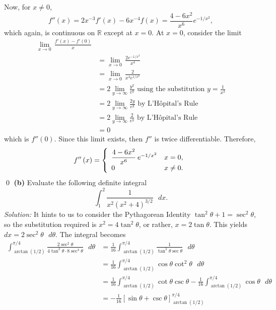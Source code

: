 \documentclass{article}
\begin{document}
\newline Now, for $x\ne 0$, \[f''(x)=2x^{-3}f'(x)-6x^{-4}f(x)=\frac{4-6x^2}{x^6}e^{-1/x^2},\] which again, is continuous on $\mathbb{R}$ except at $x=0$. At $x=0$, consider the limit \begin{align*}
    \underset{x\to 0}{\mathop{\lim }}\,\frac{f'(x)-f'(0)}{x}\\&=\underset{x\to 0}{\mathop{\lim }}\,\frac{2{{e}^{-1/{{x}^{2}}}}}{{{x}^{4}}}\\&=\underset{x\to 0}{\mathop{\lim }}\,\frac{2}{{{x}^{4}}{{e}^{1/{{x}^{2}}}}}\\&=2\lim_{y\rightarrow \infty}\frac{y^2}{e^y}\text{ using the substitution }y=\frac{1}{x^2}\\
    &=2\lim_{y\rightarrow \infty}\frac{2y}{e^y}\text{ by L'Hôpital's Rule}\\
    &=2\lim_{y\rightarrow\infty}\frac{2}{e^y}\text{ by L'Hôpital's Rule}\\&=0
\end{align*} which is $f''(0)$. Since this limit exists, then $f''$ is twice differentiable. Therefore, \[f''\left( x \right)=\left\{ \begin{array}{*{35}{l}}
   \cfrac{4-6{{x}^{2}}}{{{x}^{6}}}\text{ }{{e}^{-1/{{x}^{2}}}} & x=0,  \\
   0 & x\ne 0.  \\
\end{array} \right.\]
\qed
\newline
\newline\textbf{(b)} Evaluate the following definite integral \[\int_{1}^{2}\frac{1}{x^2(x^2+4)^{3/2}}\text{ }dx.\]
\textit{Solution:} It hints to us to consider the Pythagorean Identity $\operatorname{tan}^2\theta+1=\sec^2\theta$, so the substitution required is $x^2=4\operatorname{tan}^2\theta$, or rather, $x=2\operatorname{tan}\theta$. This yields $dx=2\operatorname{sec}^2\theta\text{ }d\theta$. The integral becomes \begin{align*}
    \int_{\operatorname{arctan}(1/2)}^{\pi/4}\frac{2\operatorname{sec}^2\theta}{4\operatorname{tan}^2\theta \cdot 8\operatorname{sec}^3\theta}\text{ }d\theta&=\frac{1}{16}\int_{\operatorname{arctan}(1/2)}^{\pi/4}\frac{1}{\operatorname{tan}^2\theta\operatorname{sec}\theta}\text{ }d\theta\\
    &=\frac{1}{16}\int_{\operatorname{arctan}(1/2)}^{\pi/4}\operatorname{cos}\theta\operatorname{cot}^2\theta\text{ }d\theta\\
    &=\frac{1}{16}\int_{\operatorname{arctan}(1/2)}^{\pi/4}\operatorname{cot}\theta\operatorname{csc}\theta-\frac{1}{16}\int_{\operatorname{arctan}(1/2)}^{\pi/4}\operatorname{cos}\theta\text{ }d\theta\\
    &=-\frac{1}{16}\left[\operatorname{sin}\theta+\operatorname{csc}\theta\right]_{\operatorname{arctan}(1/2)}^{\pi/4}
\end{align*}
\end{document}
